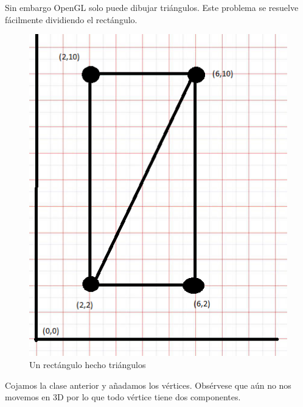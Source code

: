 \documentclass[a4paper,12pt,spanish]{sphinxmanual}
\begin{document}
Sin embargo OpenGL solo puede dibujar triángulos. Este problema se resuelve fácilmente dividiendo el rectángulo.
\begin{figure}[htbp]
\centering
\capstart

\includegraphics{ejerectangulotriangulos.png}
\caption{Un rectángulo hecho triángulos}\end{figure}

Cojamos la clase  anterior y añadamos los vértices. Obsérvese que aún no nos movemos en 3D por lo que todo vértice tiene dos componentes.
\end{document}
